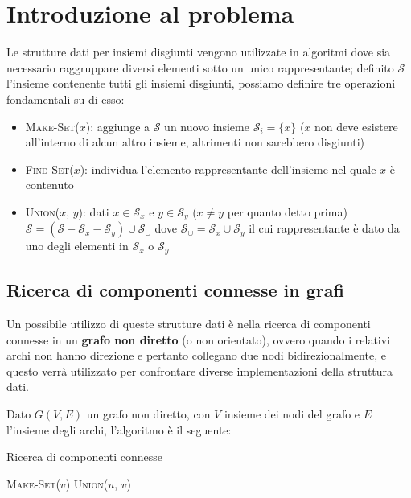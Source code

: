 \section{Introduzione al problema}

Le strutture dati per insiemi disgiunti vengono utilizzate in algoritmi
dove sia necessario raggruppare diversi elementi sotto un unico rappresentante;
definito $\mathcal{S}$ l'insieme contenente tutti gli insiemi disgiunti,
possiamo definire tre operazioni fondamentali su di esso:

\begin{itemize}
    \item \textsc{Make-Set($x$)}: aggiunge a $\mathcal{S}$ un nuovo insieme
          $\mathcal{S}_i = \{x\}$ ($x$ non deve esistere all'interno di alcun altro insieme,
          altrimenti non sarebbero disgiunti)
    \item \textsc{Find-Set($x$)}: individua l'elemento rappresentante dell'insieme nel quale $x$ è contenuto
    \item \textsc{Union($x$, $y$)}: dati $x \in \mathcal{S}_x$ e $y \in \mathcal{S}_y$
          ($x \ne y$ per quanto detto prima) $\mathcal{S} = (\mathcal{S} - \mathcal{S}_x - \mathcal{S}_y) \cup \mathcal{S}_\cup$
          dove $\mathcal{S}_\cup = \mathcal{S}_x \cup \mathcal{S}_y$ il cui rappresentante è
          dato da uno degli elementi in $\mathcal{S}_x$ o $\mathcal{S}_y$
\end{itemize}

\subsection{Ricerca di componenti connesse in grafi}

Un possibile utilizzo di queste strutture dati è nella ricerca di componenti
connesse in un \textbf{grafo non diretto} (o non orientato), ovvero quando i relativi
archi non hanno direzione e pertanto collegano due nodi bidirezionalmente,
e questo verrà utilizzato per confrontare diverse implementazioni della
struttura dati.\newline

Dato $G(V,E)$ un grafo non diretto, con $V$ insieme dei nodi del grafo e $E$
l'insieme degli archi, l'algoritmo è il seguente:

\begin{algorithm}
    \caption{Ricerca di componenti connesse}\label{connectedComponentsAlg}
    \begin{algorithmic}[1]
         \label{alg:firstfor}
        \STATE \textsc{Make-Set($v$)}
        \ENDFOR
         \label{alg:secondfor}
        \STATE \textsc{Union($u$, $v$)}
        \ENDIF
        \ENDFOR
    \end{algorithmic}
\end{algorithm}


